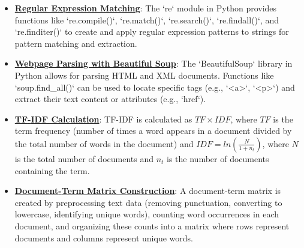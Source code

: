 \documentclass{article}%
\begin{document}
\begin{itemize}[leftmargin=*]%
\item \href{https://purdue.brightspace.com/d2l/common/assets/pdfjs-d2l-dist/1.0.14-legacy/web/viewer.html?file=\%2Fcontent\%2Fenforced\%2F1095465-WL.202510.CS24200.LE1\%2F05L1-parsing.pdf\%3Fou\%3D1095465\&lang=en-us\&container=d2l-fileviewer-rendered-pdf\&fullscreen=d2l-fileviewer-rendered-pdf-dialog\&height=667#page=4}{\textbf{Regular Expression Matching}}: The `re` module in Python provides functions like `re.compile()`, `re.match()`, `re.search()`, `re.findall()`, and `re.finditer()` to create and apply regular expression patterns to strings for pattern matching and extraction.%
\item \href{https://purdue.brightspace.com/d2l/common/assets/pdfjs-d2l-dist/1.0.14-legacy/web/viewer.html?file=\%2Fcontent\%2Fenforced\%2F1095465-WL.202510.CS24200.LE1\%2F05L1-parsing.pdf\%3Fou\%3D1095465\&lang=en-us\&container=d2l-fileviewer-rendered-pdf\&fullscreen=d2l-fileviewer-rendered-pdf-dialog\&height=667#page=17}{\textbf{Webpage Parsing with Beautiful Soup}}: The `BeautifulSoup` library in Python allows for parsing HTML and XML documents. Functions like `soup.find_all()` can be used to locate specific tags (e.g., `\textless{}a>`, `\textless{}p>`) and extract their text content or attributes (e.g., `href`).%
\item \href{https://purdue.brightspace.com/d2l/common/assets/pdfjs-d2l-dist/1.0.14-legacy/web/viewer.html?file=\%2Fcontent\%2Fenforced\%2F1095465-WL.202510.CS24200.LE1\%2F05L1-parsing.pdf\%3Fou\%3D1095465\&lang=en-us\&container=d2l-fileviewer-rendered-pdf\&fullscreen=d2l-fileviewer-rendered-pdf-dialog\&height=667#page=25}{\textbf{TF{-}IDF Calculation}}: TF-IDF is calculated as $TF \times IDF$, where $TF$ is the term frequency (number of times a word appears in a document divided by the total number of words in the document) and $IDF = ln(\frac{N}{1 + n_t})$, where $N$ is the total number of documents and $n_t$ is the number of documents containing the term.%
\item \href{https://purdue.brightspace.com/d2l/common/assets/pdfjs-d2l-dist/1.0.14-legacy/web/viewer.html?file=\%2Fcontent\%2Fenforced\%2F1095465-WL.202510.CS24200.LE1\%2F05L1-parsing.pdf\%3Fou\%3D1095465\&lang=en-us\&container=d2l-fileviewer-rendered-pdf\&fullscreen=d2l-fileviewer-rendered-pdf-dialog\&height=667#page=26}{\textbf{Document{-}Term Matrix Construction}}: A document-term matrix is created by preprocessing text data (removing punctuation, converting to lowercase, identifying unique words), counting word occurrences in each document, and organizing these counts into a matrix where rows represent documents and columns represent unique words.%
\end{itemize}%
\end{document}
